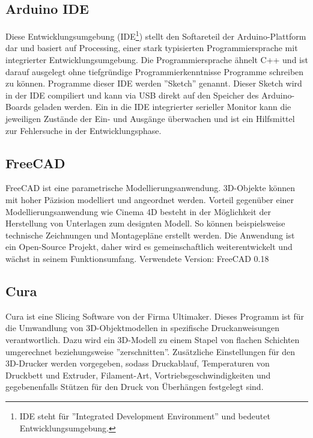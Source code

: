 \documentclass[11pt, titlepage, fleqn]{report}
\begin{document}
			\subsection*{Arduino IDE}
			\label{sec:Arduino IDE}
				Diese Entwicklungsumgebung (IDE\footnote{IDE steht für ''Integrated Development Environment'' und bedeutet Entwicklungsumgebung.}) stellt den Softareteil der Arduino-Plattform dar und basiert auf Processing, einer stark typisierten Programmiersprache mit integrierter Entwicklungsumgebung. Die Programmiersprache ähnelt C++ und ist darauf ausgelegt ohne tiefgründige Programmierkenntnisse Programme schreiben zu können. Programme dieser IDE werden ''Sketch'' genannt. Dieser Sketch wird in der IDE compiliert und kann via USB direkt auf den Speicher des Arduino-Boards geladen werden. Ein in die IDE integrierter serieller Monitor kann die jeweiligen Zustände der Ein- und Ausgänge überwachen und ist ein Hilfsmittel zur Fehlersuche in der Entwicklungsphase.
			\subsection*{FreeCAD}
			\label{sec:FreeCAD}
				FreeCAD ist eine parametrische Modellierungsanwendung. 3D-Objekte können mit hoher Päzision modelliert und angeordnet werden. Vorteil gegenüber einer Modellierungsanwendung wie Cinema 4D besteht in der Möglichkeit der Herstellung von Unterlagen zum designten Modell. So können beispielsweise technische Zeichnungen und Montagepläne erstellt werden. Die Anwendung ist ein Open-Source Projekt, daher wird es gemeinschaftlich weiterentwickelt und wächst in seinem Funktionsumfang. Verwendete Version: FreeCAD 0.18
			\subsection*{Cura}
			\label{sec:Cura}
				Cura ist eine Slicing Software von der Firma Ultimaker. Dieses Programm ist für die Umwandlung von 3D-Objektmodellen in spezifische Druckanweisungen verantwortlich. Dazu wird ein 3D-Modell zu einem Stapel von flachen Schichten umgerechnet beziehungsweise ''zerschnitten''. Zusätzliche Einstellungen für den 3D-Drucker werden vorgegeben, sodass Druckablauf, Temperaturen von Druckbett und Extruder, Filament-Art, 
				Vortriebsgeschwindigkeiten und gegebenenfalls Stützen für den Druck von Überhängen festgelegt sind.
\end{document}
